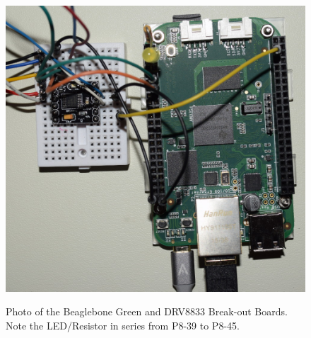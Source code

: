 \begin{figure}[H]
	\centering
	\includegraphics[width=1.0\textwidth]{photos/top_view.jpg}
	\centering\bfseries
	\caption{Photo of the Beaglebone Green and DRV8833 Break-out Boards.  Note the LED/Resistor in series from P8-39 to P8-45.}
\end{figure}





